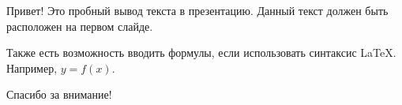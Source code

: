 \begin{frame}
	Привет! Это пробный вывод текста в презентацию. Данный текст должен быть расположен на первом слайде.
\end{frame}

\begin{frame}
	Также есть возможность вводить формулы, если использовать синтаксис LaTeX. Например, $y = f(x)$.
\end{frame}

\begin{frame}
	Спасибо за внимание!
\end{frame}

